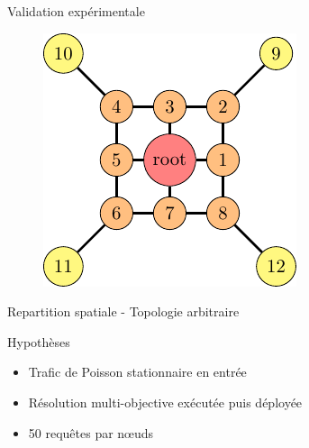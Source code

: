 \begin{frame}{Validation expérimentale}
  \begin{figure}
    \centering
    \includegraphics[scale=.7]{figures/topology_cache_slides.pdf}
  \end{figure}
  Repartition spatiale - Topologie arbitraire

  \begin{block}{Hypothèses}
    \begin{itemize}
      \item Trafic de Poisson stationnaire en entrée
      \item Résolution multi-objective exécutée puis déployée
      \item 50 requêtes par nœuds
    \end{itemize}
  \end{block}

\end{frame}

